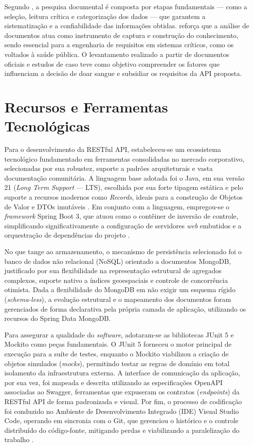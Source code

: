 Segundo , a pesquisa documental é composta por etapas fundamentais --- como a seleção, leitura crítica e categorização dos dados --- que garantem a sistematização e a confiabilidade das informações obtidas.  reforça que a análise de documentos atua como instrumento de captura e construção do conhecimento, sendo essencial para a engenharia de requisitos em sistemas críticos, como os voltados à saúde pública. O levantamento realizado a partir de documentos oficiais e estudos de caso teve como objetivo compreender os fatores que influenciam a decisão de doar sangue e subsidiar os requisitos da API proposta.

\section{Recursos e Ferramentas Tecnológicas}
\label{sec:recursos-tecnologicos}

Para o desenvolvimento da RESTful API, estabeleceu-se um ecossistema tecnológico fundamentado em ferramentas consolidadas no mercado corporativo, selecionadas por sua robustez, suporte a padrões arquiteturais e vasta documentação comunitária. A linguagem base adotada foi o Java, em sua versão 21 (\textit{Long Term Support} --- LTS), escolhida por sua forte tipagem estática e pelo suporte a recursos modernos como \textit{Records}, ideais para a construção de Objetos de Valor e DTOs imutáveis \cite{deitel2017}. Em conjunto com a linguagem, empregou-se o \textit{framework} Spring Boot 3, que atuou como o contêiner de inversão de controle, simplificando significativamente a configuração de servidores \textit{web} embutidos e a orquestração de dependências do projeto \cite{walls2019}.

No que tange ao armazenamento, o mecanismo de persistência selecionado foi o banco de dados não relacional (NoSQL) orientado a documentos MongoDB, justificado por sua flexibilidade na representação estrutural de agregados complexos, suporte nativo a índices geoespaciais e controle de concorrência otimista. Dada a flexibilidade do MongoDB em não exigir um esquema rígido (\textit{schema-less}), a evolução estrutural e o mapeamento dos documentos foram gerenciados de forma declarativa pela própria camada de aplicação, utilizando os recursos do Spring Data MongoDB.

Para assegurar a qualidade do \textit{software}, adotaram-se as bibliotecas JUnit 5 e Mockito como peças fundamentais. O JUnit 5 forneceu o motor principal de execução para a suíte de testes, enquanto o Mockito viabilizou a criação de objetos simulados (\textit{mocks}), permitindo testar as regras de domínio em total isolamento da infraestrutura externa. A interface de comunicação da aplicação, por sua vez, foi mapeada e descrita utilizando as especificações OpenAPI associadas ao Swagger, ferramentas que expuseram os contratos (\textit{endpoints}) da RESTful API de forma padronizada e visual. Por fim, o processo de codificação foi conduzido no Ambiente de Desenvolvimento Integrado (IDE) Visual Studio Code, operando em sincronia com o Git, que gerenciou o histórico e o controle distribuído do código-fonte, mitigando perdas e viabilizando a paralelização do trabalho \cite{chacon2014}.

